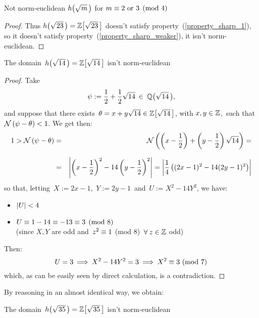 \begin{subsection}{Not norm-euclidean $\hh{m}$ for %
                   $m \equiv 2 \text{ or } 3 \pmod 4$}
\begin{proof}
Thus $\hh{23} = \ZZ{23}$ doesn't satisfy
property~(\ref{property_sharp_1}), so it doesn't satisfy
property~(\ref{property_sharp_weaker}), \ie it isn't
norm-euclidean.
%
\end{proof}

\begin{thm}\label{h(sqrt(14)) not norm-euclidean}
The domain\, $\hh{14} = \ZZ{14}$ isn't norm-euclidean
\end{thm}

\begin{proof}
%
Take
$$ \psi:= \frac{1}{2} + \frac{1}{2} \sqrt{14} \:\in\: \QQ{14}, $$
and suppose that there exists\,
$\theta = x + y\sqrt{14} \in \ZZ{14}$, with $x, y\in\mathbb{Z}$,
\,such that\, $\mathcal{N}\left(\psi - \theta\right) < 1$.
We get then:
%
\begin{eqnarray*}
1 > \mathcal{N}\left(\psi - \theta\right) & = &
\mathcal{N}\left(\left(x - \frac{1}{2}\right) +
\left(y - \frac{1}{2}\right)\sqrt{14}\right) = \\[7pt]
& = & \left|\left(x - \frac{1}{2}\right)^2
- 14\left(y - \frac{1}{2}\right)^2\right| =
\left|\frac{1}{4}\left((2x - 1)^2 - 14(2y - 1)^2\right)\right|
\end{eqnarray*}
%
so that, letting\, $X:= 2x - 1$,\, $Y:= 2y - 1$\,
and\, $U:= X^2 - 14Y^2$, we have:
\begin{itemize}

\item $\left|U\right| < 4$

\item $U \equiv 1 - 14 \equiv -13 \equiv 3 \pmod 8$\\
(since $X,Y$ are odd and\, $z^2 \equiv 1$
(mod $8$)\, $\forall\: z \in \mathbb{Z}$ odd)

\end{itemize}

Then:
$$
U = 3 \:\Longrightarrow\: X^2 - 14Y^2 = 3 \:\Longrightarrow\:
X^2 \equiv 3\ (\mathrm{mod}\ 7)
$$
%
which, as can be easily seen by direct calculation, is a contradiction.
\end{proof}

By reasoning in an almost identical way, we obtain:

\begin{thm}\label{h(sqrt(35)) not norm-euclidean}
The domain\, $\hh{35} = \ZZ{35}$ isn't norm-euclidean
\end{thm}


\end{subsection}
